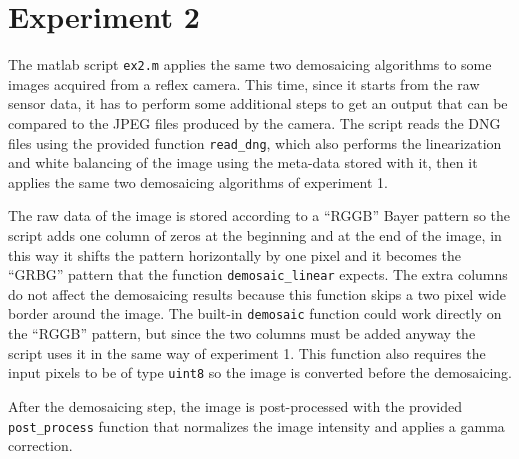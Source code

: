 \documentclass{article}
\newcommand{\inlinecode}[1]{\lstinline[basicstyle=\ttfamily,keywordstyle={}]{#1}}
\begin{document}
\section*{Experiment 2}
The matlab script \inlinecode{ex2.m} applies the same two demosaicing
algorithms to some images acquired from a reflex camera. This time,
since it starts from the raw sensor data, it has to perform some
additional steps to get an output that can be compared to the JPEG
files produced by the camera. The script reads the DNG files using the
provided function \inlinecode{read_dng}, which also performs the
linearization and white balancing of the image using the meta-data
stored with it, then it applies the same two demosaicing algorithms
of experiment 1.

The raw data of the image is stored according to a ``RGGB'' Bayer
pattern so the script adds one column of zeros at the beginning and at
the end of the image, in this way it shifts the pattern horizontally
by one pixel and it becomes the ``GRBG'' pattern that the function
\inlinecode{demosaic_linear} expects. The extra columns do not affect
the demosaicing results because this function skips a two pixel wide
border around the image.  The built-in \inlinecode{demosaic} function
could work directly on the ``RGGB'' pattern, but since the two columns
must be added anyway the script uses it in the same way of experiment
1. This function also requires the input pixels to be of type
\inlinecode{uint8} so the image is converted before the demosaicing.

After the demosaicing step, the image is post-processed with the
provided \inlinecode{post_process} function that normalizes the image
intensity and applies a gamma correction.
\end{document}
